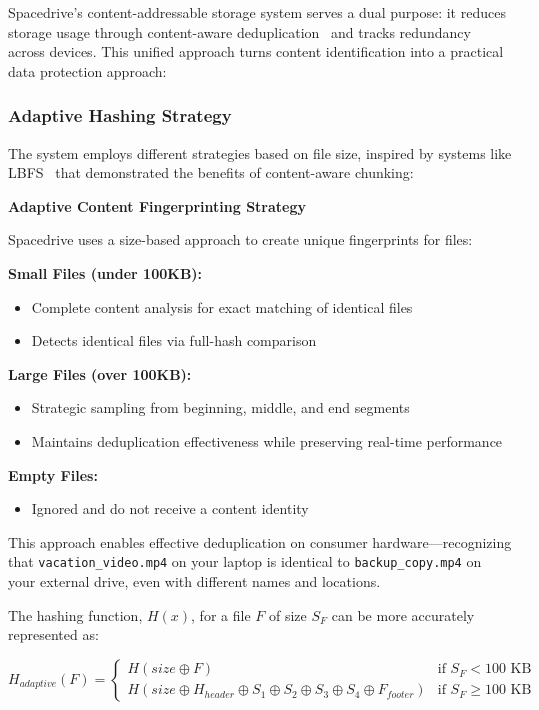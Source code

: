 \documentclass[sigconf]{acmart}
\begin{document}
Spacedrive's content-addressable storage system serves a dual purpose: it reduces storage usage through content-aware deduplication~\cite{zhu_dedup_2008} and tracks redundancy across devices. This unified approach turns content identification into a practical data protection approach:

\subsubsection{Adaptive Hashing Strategy}
The system employs different strategies based on file size, inspired by systems like LBFS~\cite{muthitacharoen_lbfs_2001} that demonstrated the benefits of content-aware chunking:


\textbf{Adaptive Content Fingerprinting Strategy}

Spacedrive uses a size-based approach to create unique fingerprints for files:

\textbf{Small Files (under 100KB):}
\begin{itemize}[noitemsep, topsep=0pt]
\item Complete content analysis for exact matching of identical files
\item Detects identical files via full-hash comparison
\end{itemize}

\textbf{Large Files (over 100KB):}
\begin{itemize}[noitemsep, topsep=0pt]
 \item Strategic sampling from beginning, middle, and end segments
 \item Maintains deduplication effectiveness while preserving real-time performance

\end{itemize}

\textbf{Empty Files:}
\begin{itemize}[noitemsep, topsep=0pt]
 \item Ignored and do not receive a content identity
\end{itemize}

This approach enables effective deduplication on consumer hardware—recognizing that \texttt{vacation\_video.mp4} on your laptop is identical to \texttt{backup\_copy.mp4} on your external drive, even with different names and locations.

The hashing function, $H(x)$, for a file $F$ of size $S_F$ can be more accurately represented as:

\boldmath
$H_{adaptive}(F) = \begin{cases} H(size \oplus F) & \text{if } S_F < 100 \text{ KB} \\ H(size \oplus H_{header} \oplus S_1 \oplus S_2 \oplus S_3 \oplus S_4 \oplus F_{footer}) & \text{if } S_F \geq 100 \text{ KB} \end{cases}$
\unboldmath
\end{document}
